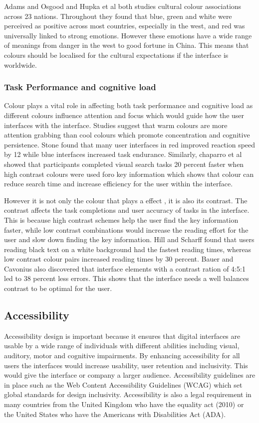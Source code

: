 \documentclass[]{project_final}
\begin{document}
Adams and Osgood and Hupka et al both studies cultural colour associations across 23 nations. Throughout they found that blue, green and white were perceived as positive across most countries, especially in the west, and red was universally linked to strong emotions. However these emotions have a wide range of meanings from danger in the west to good fortune in China. This means that colours should be localised for the cultural expectations if the interface is worldwide.\cite{inc_how_2020}

\subsubsection{Task Performance and cognitive load}

Colour plays a vital role in affecting both task performance and cognitive load as different colours influence attention and focus which would guide how the user interfaces with the interface. Studies suggest that warm colours are more attention grabbing than cool colours which promote concentration and cognitive persistence. Stone found that many user interfaces in red improved reaction speed by 12 while blue interfaces increased task endurance. Similarly, chaparro et al showed that participants completed visual search tasks 20 percent faster when high contrast colours were used foro key information which shows that colour can reduce search time and increase efficiency for the user within the interface.

However it is not only the colour that plays a effect , it is also its contrast. The contrast affects the task completions and user accuracy of tasks in the interface. This is because high contrast schemes help the user find the key information faster, while low contrast combinations would increase the reading effort for the user and slow down finding the key information. Hill and Scharff found that users reading black text on a white background had the fastest reading times, whereas low contrast colour pairs increased reading times by 30 percent. Bauer and Cavonius also discovered that interface elements with a  contrast ration of 4:5:1 led to 38 percent less errors. This shows that the interface needs a well balances contrast to be optimal for the user.\cite{colour_readability}

\subsection{Accessibility}
Accessibility design is important because it ensures that digital interfaces are usable by a wide range of individuals with different abilities including visual, auditory, motor and cognitive impairments. By enhancing accessibility for all users the interfaces would increase usability, user retention and inclusivity. This would give the interface or company a larger audience. Accessibility guidelines are in place such as the Web Content Accessibility Guidelines (WCAG) which set global standards for design inclusivity. Accessibility is also a legal requirement in many countries from the United Kingdom who have the equality act (2010) or the United States who have the Americans with Disabilities Act (ADA).
\end{document}
